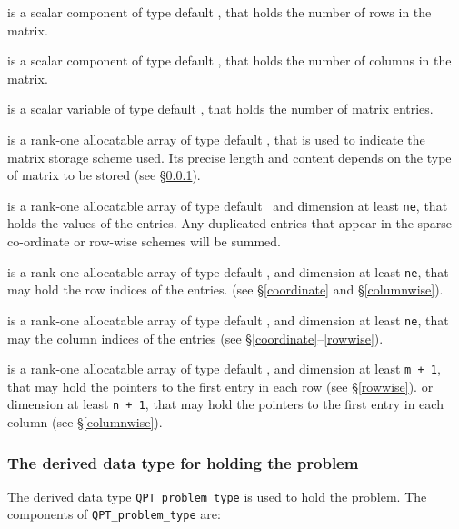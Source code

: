 \documentclass{galahad}
\begin{document}
\begin{description}

 is a scalar component of type default \integer,
that holds the number of rows in the matrix.

 is a scalar component of type default \integer,
that holds the number of columns in the matrix.

 is a scalar variable of type default \integer, that
holds the number of matrix entries.

 is a rank-one allocatable array of type default \character, that
is used to indicate the matrix storage scheme used. Its precise length and
content depends on the type of matrix to be stored (see \S\ref{typeprob}).

 is a rank-one allocatable array of type default \realdp\,
and dimension at least {\tt ne}, that holds the values of the entries.
Any duplicated entries that appear in the sparse
co-ordinate or row-wise schemes will be summed.

 is a rank-one allocatable array of type default \integer,
and dimension at least {\tt ne}, that may hold the row indices of the entries.
(see \S\ref{coordinate} and \S\ref{columnwise}).

 is a rank-one allocatable array of type default \integer,
and dimension at least {\tt ne}, that may the column indices of the entries
(see \S\ref{coordinate}--\ref{rowwise}).

 is a rank-one allocatable array of type default \integer,
and dimension at least {\tt m + 1}, that may hold the pointers to
the first entry in each row (see \S\ref{rowwise}).
or dimension at least {\tt n + 1}, that may hold the pointers to
the first entry in each column (see \S\ref{columnwise}).

\end{description}


\subsubsection{The derived data type for holding the problem}\label{typeprob}
The derived data type {\tt QPT\_problem\_type} is used to hold
the problem. The components of
{\tt QPT\_problem\_type}
are:
\end{document}
